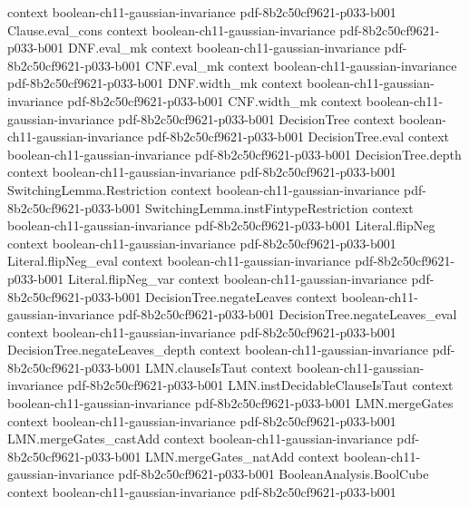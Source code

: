 \begin{theorem}
  {context}
  {boolean-ch11-gaussian-invariance}
  {pdf-8b2c50cf9621-p033-b001}
\proofstep
  {Clause.eval_cons}
  {context}
  {boolean-ch11-gaussian-invariance}
  {pdf-8b2c50cf9621-p033-b001}
\proofstep
  {DNF.eval_mk}
  {context}
  {boolean-ch11-gaussian-invariance}
  {pdf-8b2c50cf9621-p033-b001}
\proofstep
  {CNF.eval_mk}
  {context}
  {boolean-ch11-gaussian-invariance}
  {pdf-8b2c50cf9621-p033-b001}
\proofstep
  {DNF.width_mk}
  {context}
  {boolean-ch11-gaussian-invariance}
  {pdf-8b2c50cf9621-p033-b001}
\proofstep
  {CNF.width_mk}
  {context}
  {boolean-ch11-gaussian-invariance}
  {pdf-8b2c50cf9621-p033-b001}
\proofstep
  {DecisionTree}
  {context}
  {boolean-ch11-gaussian-invariance}
  {pdf-8b2c50cf9621-p033-b001}
\proofstep
  {DecisionTree.eval}
  {context}
  {boolean-ch11-gaussian-invariance}
  {pdf-8b2c50cf9621-p033-b001}
\proofstep
  {DecisionTree.depth}
  {context}
  {boolean-ch11-gaussian-invariance}
  {pdf-8b2c50cf9621-p033-b001}
\proofstep
  {SwitchingLemma.Restriction}
  {context}
  {boolean-ch11-gaussian-invariance}
  {pdf-8b2c50cf9621-p033-b001}
\proofstep
  {SwitchingLemma.instFintypeRestriction}
  {context}
  {boolean-ch11-gaussian-invariance}
  {pdf-8b2c50cf9621-p033-b001}
\proofstep
  {Literal.flipNeg}
  {context}
  {boolean-ch11-gaussian-invariance}
  {pdf-8b2c50cf9621-p033-b001}
\proofstep
  {Literal.flipNeg_eval}
  {context}
  {boolean-ch11-gaussian-invariance}
  {pdf-8b2c50cf9621-p033-b001}
\proofstep
  {Literal.flipNeg_var}
  {context}
  {boolean-ch11-gaussian-invariance}
  {pdf-8b2c50cf9621-p033-b001}
\proofstep
  {DecisionTree.negateLeaves}
  {context}
  {boolean-ch11-gaussian-invariance}
  {pdf-8b2c50cf9621-p033-b001}
\proofstep
  {DecisionTree.negateLeaves_eval}
  {context}
  {boolean-ch11-gaussian-invariance}
  {pdf-8b2c50cf9621-p033-b001}
\proofstep
  {DecisionTree.negateLeaves_depth}
  {context}
  {boolean-ch11-gaussian-invariance}
  {pdf-8b2c50cf9621-p033-b001}
\proofstep
  {LMN.clauseIsTaut}
  {context}
  {boolean-ch11-gaussian-invariance}
  {pdf-8b2c50cf9621-p033-b001}
\proofstep
  {LMN.instDecidableClauseIsTaut}
  {context}
  {boolean-ch11-gaussian-invariance}
  {pdf-8b2c50cf9621-p033-b001}
\proofstep
  {LMN.mergeGates}
  {context}
  {boolean-ch11-gaussian-invariance}
  {pdf-8b2c50cf9621-p033-b001}
\proofstep
  {LMN.mergeGates_castAdd}
  {context}
  {boolean-ch11-gaussian-invariance}
  {pdf-8b2c50cf9621-p033-b001}
\proofstep
  {LMN.mergeGates_natAdd}
  {context}
  {boolean-ch11-gaussian-invariance}
  {pdf-8b2c50cf9621-p033-b001}
\proofstep
  {BooleanAnalysis.BoolCube}
  {context}
  {boolean-ch11-gaussian-invariance}
  {pdf-8b2c50cf9621-p033-b001}

\end{theorem}
